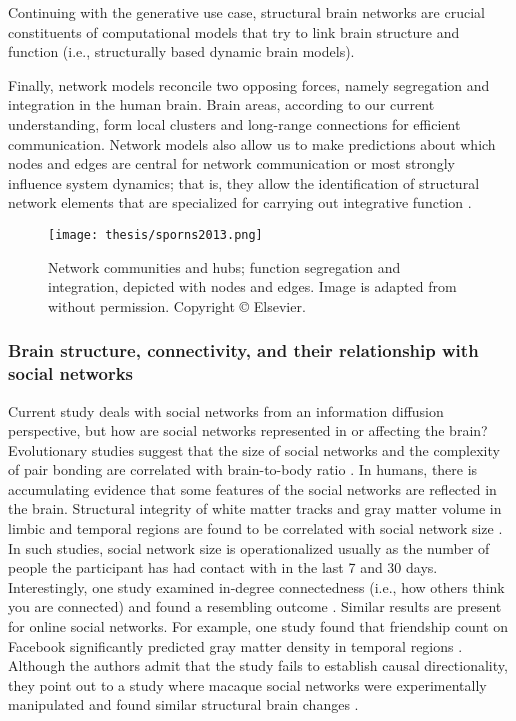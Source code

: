 \documentclass[11pt,a4paper]{article}
\begin{document}
        Continuing with the generative use case, structural brain networks are crucial constituents of computational models that try to link brain structure and function (i.e., structurally based dynamic brain models). 
        
        Finally, network models reconcile two opposing forces, namely segregation and integration in the human brain. Brain areas, according to our current understanding, form local clusters and long-range connections for efficient communication. Network models also allow us to make predictions about which nodes and edges are central for network communication or most strongly influence system dynamics; that is, they allow the identification of structural network elements that are specialized for carrying out integrative function \cite{sporns_contributions_2014}.  

        \begin{figure}[H]
            \hypertarget{fig:sporns-2013}{}
            \centering
            \texttt{[image: thesis/sporns2013.png]}\\
            \caption{Network communities and hubs; function segregation and integration, depicted with nodes and edges. Image is adapted from \cite{sporns_network_2013} without permission. Copyright \copyright {} Elsevier.} 
            \label{fig:enter-label}
        \end{figure}
        
        \subsubsection{Brain structure, connectivity, and their relationship with social networks}
        Current study deals with social networks from an information diffusion perspective, but how are social networks represented in or affecting the brain? Evolutionary studies suggest that the size of social networks and the complexity of pair bonding are correlated with brain-to-body ratio \cite{dunbar_evolution_2007}. In humans, there is accumulating evidence that some features of the social networks are reflected in the brain. Structural integrity of white matter tracks and gray matter volume in limbic and temporal regions are found to be correlated with social network size \cite{noonan_structural_2018,von_der_heide_social_2014}. In such studies, social network size is operationalized usually as the number of people the participant has had contact with in the last 7 and 30 days. Interestingly, one study examined in-degree connectedness (i.e., how others think you are connected) and found a resembling outcome \cite{kwak_social_2018}. Similar results are present for online social networks. For example, one study found that friendship count on Facebook significantly predicted gray matter density in temporal regions \cite{kanai_online_2012,von_der_heide_social_2014}. Although the authors admit that the study fails to establish causal directionality, they point out to a study where macaque social networks were experimentally manipulated and found similar structural brain changes \cite{sallet_social_2011}.
        
\end{document}
